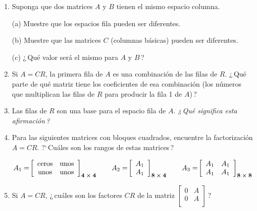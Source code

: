 \documentclass[12pt,a4paper]{article}
\newcommand{\bi}[1]{\hbox{\boldmath$#1$}}
\newcommand\1{\mbox{\,\vrule height-0.8pt depth1.0pt width2pc\,}}
\newcommand\2{\mbox{\,\vrule height-0.8pt depth1.0pt width1pc\,}}
\begin{document}
\begin{enumerate}
\item Suponga que dos matrices $A$ y $B$ tienen el mismo espacio columna.

(a)\; Muestre que los espacios fila pueden ser diferentes.

(b)\; Muestre que las matrices $C$ (columnas básicas) pueden ser diferentes.

(c)\; ¿\,Qué valor será el mismo para $A$ y $B$\,?

\item Si $A = CR$, la primera fila de $A$ es una combinación de las filas de $R$. ¿\,Qué parte de qué matriz tiene los coeficientes de esa combinación (los números que multiplican las filas de $R$ para producir la fila 1 de $A$)\,?

\item Las filas de $R$ son una base para el espacio fila de $A$. \emph{¿\,Qué significa esta afirmación\,?}

\item Para las siguientes matrices con bloques cuadrados, encuentre la factorización ${A = CR}$. ?`\,Cu\'ales son los rangos de estas matrices\,?

\vspace{-11pt}
$$
A_1=\!\left[\begin{array}{cc}\text{ceros}&\text{unos}\\\text{unos}& \text{unos}\end{array}\right]_{\text{\footnotesize $\bi{4\times 4}$}}\qquad A_2=\!\left[\begin{array}{c}A_1\\A_1\\\end{array}\right]_{\text{\footnotesize $\bi{8\times 4}$}}\qquad A_3=\!\left[\begin{array}{cc}A_1&A_1\\A_1&A_1\\\end{array}\right]_{\text{\footnotesize $\bi{8\times 8}$}}
$$

\item Si $A=CR$, ¿\,cuáles son los factores $CR$ de la matriz  $\left[\begin{array}{cc}0&A\\0&A\\\end{array}\right]$\,?


\end{enumerate}
\end{document}
